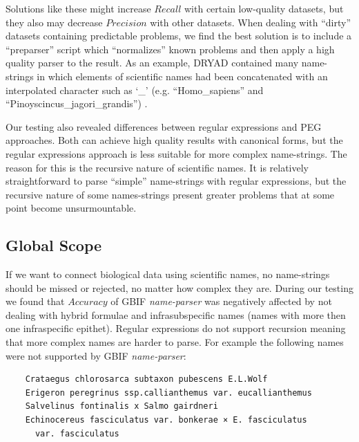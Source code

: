\documentclass{bmcart}
\begin{document}
\vspace{0.5cm}

Solutions like these might increase $Recall$ with certain low-quality datasets,
but they also may decrease $Precision$ with other datasets. When dealing with
``dirty'' datasets containing predictable problems, we find the best solution
is to include a ``preparser'' script which ``normalizes'' known problems  and
then apply a high quality parser to the result.  As an example, DRYAD contained
many name-strings in which elements of scientific names had been concatenated
with an interpolated character such as `\_’ (e.g. ``Homo\_sapiens'' and
``Pinoyscincus\_jagori\_grandis'') \cite{Patterson:inpress-a}.

Our testing also revealed differences between regular expressions and PEG
approaches. Both can achieve high quality results with canonical forms, but the
regular expressions approach is less suitable for more complex name-strings.
The reason for this is the recursive nature of scientific names.  It is
relatively straightforward to parse ``simple'' name-strings with regular
expressions, but the recursive nature of some names-strings present greater
problems that at some point become unsurmountable.

\subsection*{Global Scope}

If we want to connect biological data using scientific names, no name-strings
should be missed or rejected, no matter how complex they are. During our
testing we found that $Accuracy$ of GBIF \textit{name-parser} was negatively
affected by not dealing with hybrid formulae and infrasubspecific names (names
with more then one infraspecific epithet). Regular expressions do not support
recursion meaning that more complex names are harder to parse.  For example the
following names were not supported by GBIF \textit{name-parser}:

\vspace{0.5cm}

\begin{verbatim}
    Crataegus chlorosarca subtaxon pubescens E.L.Wolf
    Erigeron peregrinus ssp.callianthemus var. eucallianthemus
    Salvelinus fontinalis x Salmo gairdneri
    Echinocereus fasciculatus var. bonkerae × E. fasciculatus
      var. fasciculatus
\end{verbatim}

\vspace{0.5cm}
\end{document}
